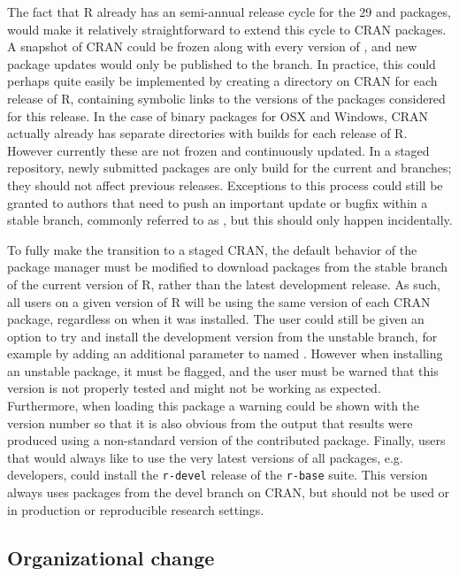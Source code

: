 The fact that R already has an semi-annual release cycle for the 29 
and  packages, would make it relatively straightforward to
extend this cycle to CRAN packages. A snapshot of CRAN could be frozen along with every
version of , and new package updates would only be published to
the  branch. In practice, this could perhaps quite easily be
implemented by creating a directory on CRAN for each release of R, containing
symbolic links to the versions of the packages considered  for this release. 
In the case of binary packages for OSX and Windows, CRAN actually already has
separate directories with builds for each release of R. However currently these
are not frozen and continuously updated. In a staged repository, newly submitted
packages are only build for the current  and  branches;
they should not affect previous releases.
Exceptions to this process could still be granted to authors that need to push an
important update or bugfix within a stable branch, commonly referred to as
, but this should only happen incidentally.

To fully make the transition to a staged CRAN, the default behavior of the package 
manager must be modified to download packages from the stable branch of the current
version of R, rather than the latest development release. 
As such, all users on a given version of R will be using the same version of each 
CRAN package, regardless on when it was installed.
The user could still be given an option to try and install the development version from the unstable branch,
for example by adding an additional parameter to  named
. However when installing an unstable package, it must be
flagged, and the user must be warned that this version is not properly tested
and might not be working as expected. Furthermore, when loading this package a
warning could be shown with the version number so that it is also obvious from
the output that results were produced using a non-standard version of the
contributed package. Finally, users that would always like to use the very
latest versions of all packages, e.g. developers, could install the
\texttt{r-devel} release of the \texttt{r-base} suite. This version always uses
packages from the devel branch on CRAN, but should not be used or in production
or reproducible research settings.

\subsection{Organizational change}

